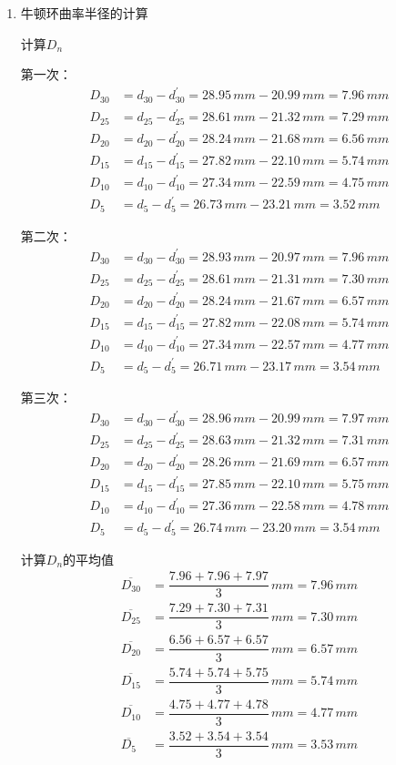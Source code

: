 \documentclass[11pt]{article}
\begin{document}
\begin{enumerate}
    \item 牛顿环曲率半径的计算
    
    计算$D_n$

    第一次：
    \begin{align*}
        D_{30}&=d_{30}-d_{30}^'=28.95\,mm-20.99\,mm=7.96\,mm \\
        D_{25}&=d_{25}-d_{25}^'=28.61\,mm-21.32\,mm=7.29\,mm \\
        D_{20}&=d_{20}-d_{20}^'=28.24\,mm-21.68\,mm=6.56\,mm \\
        D_{15}&=d_{15}-d_{15}^'=27.82\,mm-22.10\,mm=5.74\,mm \\
        D_{10}&=d_{10}-d_{10}^'=27.34\,mm-22.59\,mm=4.75\,mm \\
        D_5&=d_5-d_5^'=26.73\,mm-23.21\,mm=3.52\,mm
    \end{align*}

    第二次：
    \begin{align*}
        D_{30}&=d_{30}-d_{30}^'=28.93\,mm-20.97\,mm=7.96\,mm \\
        D_{25}&=d_{25}-d_{25}^'=28.61\,mm-21.31\,mm=7.30\,mm \\
        D_{20}&=d_{20}-d_{20}^'=28.24\,mm-21.67\,mm=6.57\,mm \\
        D_{15}&=d_{15}-d_{15}^'=27.82\,mm-22.08\,mm=5.74\,mm \\
        D_{10}&=d_{10}-d_{10}^'=27.34\,mm-22.57\,mm=4.77\,mm \\
        D_5&=d_5-d_5^'=26.71\,mm-23.17\,mm=3.54\,mm
    \end{align*}

    第三次：
    \begin{align*}
        D_{30}&=d_{30}-d_{30}^'=28.96\,mm-20.99\,mm=7.97\,mm \\
        D_{25}&=d_{25}-d_{25}^'=28.63\,mm-21.32\,mm=7.31\,mm \\
        D_{20}&=d_{20}-d_{20}^'=28.26\,mm-21.69\,mm=6.57\,mm \\
        D_{15}&=d_{15}-d_{15}^'=27.85\,mm-22.10\,mm=5.75\,mm \\
        D_{10}&=d_{10}-d_{10}^'=27.36\,mm-22.58\,mm=4.78\,mm \\
        D_5&=d_5-d_5^'=26.74\,mm-23.20\,mm=3.54\,mm
    \end{align*}

    计算$D_n$的平均值
    \begin{align*}
        \overline{D_{30}}&=\dfrac{7.96+7.96+7.97}{3}\,mm=7.96\,mm \\
        \overline{D_{25}}&=\dfrac{7.29+7.30+7.31}{3}\,mm=7.30\,mm \\
        \overline{D_{20}}&=\dfrac{6.56+6.57+6.57}{3}\,mm=6.57\,mm \\
        \overline{D_{15}}&=\dfrac{5.74+5.74+5.75}{3}\,mm=5.74\,mm \\
        \overline{D_{10}}&=\dfrac{4.75+4.77+4.78}{3}\,mm=4.77\,mm \\
        \overline{D_5}&=\dfrac{3.52+3.54+3.54}{3}\,mm=3.53\,mm
    \end{align*}
    

\end{enumerate}
\end{document}
